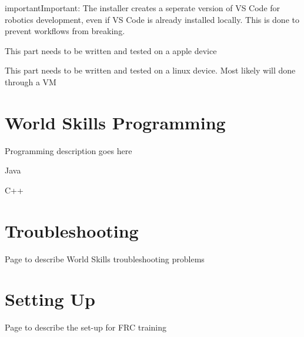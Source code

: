 \documentclass[letterpaper,10pt,english]{sphinxmanual}
\begin{document}
\begin{sphinxadmonition}{important}{Important:}
The installer creates a seperate version of VS Code for robotics development, even if VS Code is already installed locally. This is done to prevent workflows from breaking.
\end{sphinxadmonition}

This part needs to be written and tested on a apple device

This part needs to be written and tested on a linux device. Most likely will done through a VM


\chapter{World Skills Programming}
\label{\detokenize{docs/WorldSkills/programming:world-skills-programming}}\label{\detokenize{docs/WorldSkills/programming::doc}}
Programming description goes here

Java

C++

\begin{sphinxVerbatim}[commandchars=\\\{\}]
     
\end{sphinxVerbatim}

\begin{sphinxVerbatim}[commandchars=\\\{\}]
   
\end{sphinxVerbatim}


\chapter{Troubleshooting}
\label{\detokenize{docs/WorldSkills/troubleshooting:troubleshooting}}\label{\detokenize{docs/WorldSkills/troubleshooting::doc}}
Page to describe World Skills troubleshooting problems


\chapter{Setting Up}
\label{\detokenize{docs/FRCTraining/setup:setting-up}}\label{\detokenize{docs/FRCTraining/setup::doc}}
Page to describe the set-up for FRC training
\end{document}
